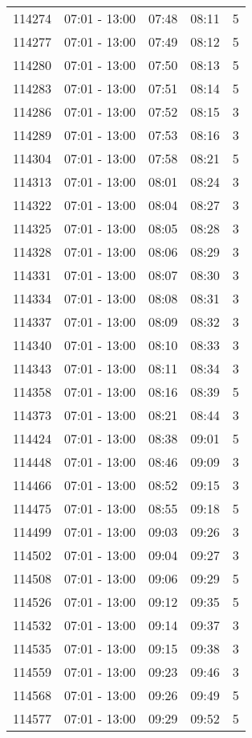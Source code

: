 \documentclass{article}
\begin{document}
\begin{tabular}{llccc}
114274 & 07:01 - 13:00 & 07:48 & 08:11 & 5 \\
114277 & 07:01 - 13:00 & 07:49 & 08:12 & 5 \\
114280 & 07:01 - 13:00 & 07:50 & 08:13 & 5 \\
114283 & 07:01 - 13:00 & 07:51 & 08:14 & 5 \\
114286 & 07:01 - 13:00 & 07:52 & 08:15 & 3 \\
114289 & 07:01 - 13:00 & 07:53 & 08:16 & 3 \\
114304 & 07:01 - 13:00 & 07:58 & 08:21 & 5 \\
114313 & 07:01 - 13:00 & 08:01 & 08:24 & 3 \\
114322 & 07:01 - 13:00 & 08:04 & 08:27 & 3 \\
114325 & 07:01 - 13:00 & 08:05 & 08:28 & 3 \\
114328 & 07:01 - 13:00 & 08:06 & 08:29 & 3 \\
114331 & 07:01 - 13:00 & 08:07 & 08:30 & 3 \\
114334 & 07:01 - 13:00 & 08:08 & 08:31 & 3 \\
114337 & 07:01 - 13:00 & 08:09 & 08:32 & 3 \\
114340 & 07:01 - 13:00 & 08:10 & 08:33 & 3 \\
114343 & 07:01 - 13:00 & 08:11 & 08:34 & 3 \\
114358 & 07:01 - 13:00 & 08:16 & 08:39 & 5 \\
114373 & 07:01 - 13:00 & 08:21 & 08:44 & 3 \\
114424 & 07:01 - 13:00 & 08:38 & 09:01 & 5 \\
114448 & 07:01 - 13:00 & 08:46 & 09:09 & 3 \\
114466 & 07:01 - 13:00 & 08:52 & 09:15 & 3 \\
114475 & 07:01 - 13:00 & 08:55 & 09:18 & 5 \\
114499 & 07:01 - 13:00 & 09:03 & 09:26 & 3 \\
114502 & 07:01 - 13:00 & 09:04 & 09:27 & 3 \\
114508 & 07:01 - 13:00 & 09:06 & 09:29 & 5 \\
114526 & 07:01 - 13:00 & 09:12 & 09:35 & 5 \\
114532 & 07:01 - 13:00 & 09:14 & 09:37 & 3 \\
114535 & 07:01 - 13:00 & 09:15 & 09:38 & 3 \\
114559 & 07:01 - 13:00 & 09:23 & 09:46 & 3 \\
114568 & 07:01 - 13:00 & 09:26 & 09:49 & 5 \\
114577 & 07:01 - 13:00 & 09:29 & 09:52 & 5 \\

\end{tabular}
\end{document}
